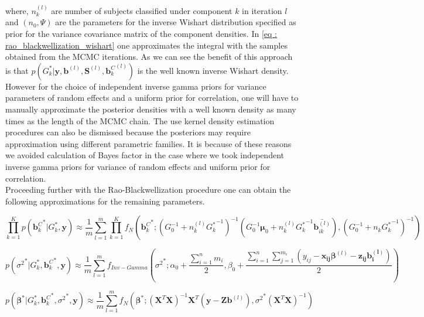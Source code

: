 where, $n_k^{(l)}$ are number of subjects classified under component $k$ in iteration $l$ and $(n_0, \Psi)$ are the parameters for the inverse Wishart distribution specified as prior for the variance covariance matrix of the component densities. In \ref{eq : rao_blackwellization_wishart} one approximates the integral with the samples obtained from the MCMC iterations. As we can see the benefit of this approach is that $p(G_k^*| \boldsymbol{y}, \boldsymbol{b}^{(l)}, \boldsymbol{S}^{(l)}, {\boldsymbol{b}_k^C}^{(l)})$ is the well known inverse Wishart density. However for the choice of independent inverse gamma priors for variance parameters of random effects and a uniform prior for correlation, one will have to manually approximate the posterior densities with a well known density as many times as the length of the MCMC chain. The use kernel density estimation procedures can also be dismissed because the posteriors may require approximation using different parametric families. It is because of these reasons we avoided calculation of Bayes factor in the case where we took independent inverse gamma priors for variance of random effects and uniform prior for correlation.\\

Proceeding further with the Rao-Blackwellization procedure one can obtain the following approximations for the remaining parameters.

\begin{equation}
\prod_{k=1}^K p({\boldsymbol{b}_k^C}^*|G_k^*, \boldsymbol{y}) \approx 
\frac 1 m \sum_{l=1}^m \prod_{k=1}^{K} f_N({\boldsymbol{b}_k^C}^*; (G_0^{-1} + n_k^{(l)} {G_k^*}^{-1})^{-1} (G_0^{-1}\boldsymbol{\mu}_0 + n_k^{(l)} {G_k^*}^{-1} \bar{\boldsymbol{b}_{ik}^{(l)}}) , (G_0^{-1} + n_k {G_k^*}^{-1})^{-1})
\end{equation}

\begin{equation}
p({\sigma^2}^*|G_k^*, {\boldsymbol{b}_k^C}^*, \boldsymbol{y}) \approx 
\frac 1 m \sum_{l=1}^m f_{Inv-Gamma}({\sigma^2}^*; \alpha_0 + \frac {\sum_{i=1}^n m_i} 2, 
\beta_0 + \frac {\sum_{i=1}^n \sum_{j=1}^{m_i} (y_{ij} - \boldsymbol{x_{ij}}\boldsymbol{\beta}^{(l)} - \boldsymbol{z_{ij}}\boldsymbol{b_i^{(l)}})} 2)
\end{equation}

\begin{equation}
p({\boldsymbol{\beta}}^*|G_k^*, {\boldsymbol{b}_k^C}^*, {\sigma^2}^*, \boldsymbol{y}) \approx 
\frac 1 m \sum_{l=1}^m f_N({\boldsymbol{\beta}}^*; (\boldsymbol{X}^T\boldsymbol{X})^{-1}\boldsymbol{X}^T(\boldsymbol{y} - {\boldsymbol{Zb}}^{(l)}), {\sigma^2}^*(\boldsymbol{X}^T\boldsymbol{X})^{-1})
\end{equation}

